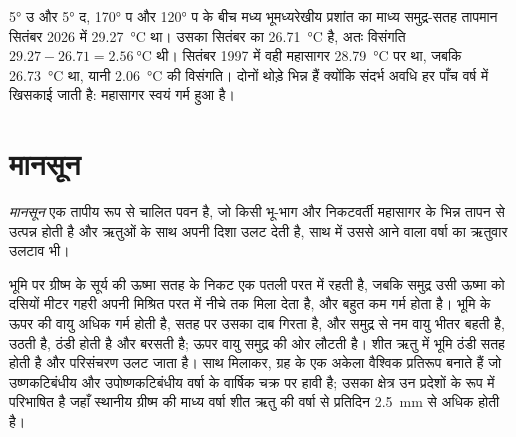 \begin{example}[एक विसंगति]\label{ex:b2:climate-variability:anomaly}
\ang{5} उ और \ang{5} द, \ang{170} प और \ang{120} प के बीच मध्य भूमध्यरेखीय प्रशांत का
माध्य समुद्र-सतह तापमान सितंबर 2026 में \qty{29.27}{\celsius} था। उसका सितंबर का
 \qty{26.71}{\celsius} है, अतः विसंगति $29.27 - 26.71 = \qty{2.56}{\celsius}$ थी।
सितंबर 1997 में वही महासागर \qty{28.79}{\celsius} पर था, जबकि  \qty{26.73}{\celsius} था, यानी
\qty{2.06}{\celsius} की विसंगति। दोनों  थोड़े भिन्न हैं क्योंकि संदर्भ
अवधि हर पाँच वर्ष में खिसकाई जाती है: महासागर स्वयं गर्म हुआ है।
\end{example}

\section{मानसून}\label{sec:b2:climate-variability:monsoons}

\begin{definition}[मानसून]\label{def:b2:climate-variability:monsoon}
\emph{मानसून} एक तापीय रूप से चालित पवन है, जो किसी भू-भाग और निकटवर्ती महासागर के
भिन्न तापन से उत्पन्न होती है और ऋतुओं के साथ अपनी दिशा उलट देती है, साथ में उससे आने वाला
वर्षा का ऋतुवार उलटाव भी।
\end{definition}

भूमि पर ग्रीष्म के सूर्य की ऊष्मा सतह के निकट एक पतली परत में रहती है, जबकि समुद्र उसी ऊष्मा को
दसियों मीटर गहरी अपनी मिश्रित परत में नीचे तक मिला देता है, और बहुत कम गर्म होता है। भूमि के ऊपर की
वायु अधिक गर्म होती है, सतह पर उसका दाब गिरता है, और समुद्र से नम वायु भीतर बहती है, उठती है, ठंडी होती है और
बरसती है; ऊपर वायु समुद्र की ओर लौटती है। शीत ऋतु में भूमि ठंडी सतह होती है और परिसंचरण
उलट जाता है। साथ मिलाकर, ग्रह के  एक अकेला वैश्विक प्रतिरूप बनाते हैं जो उष्णकटिबंधीय और
उपोष्णकटिबंधीय वर्षा के वार्षिक चक्र पर हावी है; उसका क्षेत्र उन प्रदेशों के रूप में परिभाषित है जहाँ स्थानीय
ग्रीष्म की माध्य वर्षा शीत ऋतु की वर्षा से प्रतिदिन \qty{2.5}{mm} से अधिक होती है।

